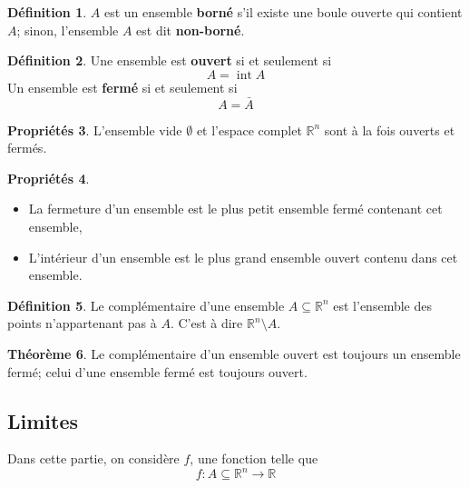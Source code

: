 \documentclass[11pt,a4paper]{article}
\theoremstyle{definition}
\newtheorem{mydef}{Définition}%
\newtheorem{myprop}[mydef]{Propriétés}
\newtheorem{mytheo}[mydef]{Théorème}
\DeclareMathOperator{\newint}{int}
\newcommand{\R}{\mathbb{R}}
\newcommand{\Rn}{\R^n}
\newcommand*\InsertTheoremBreak{%
	\begingroup %
		\setlength\itemsep{0pt}%
		\setlength\parsep{0pt}%
		\item[\vbox{\null}]%
	\endgroup%
}%
\begin{document}
\begin{mydef}
	$A$ est un ensemble \textbf{borné} s'il existe une boule ouverte qui contient $A$;
	sinon, l'ensemble $A$ est dit \textbf{non-borné}.
\end{mydef}

\begin{mydef}
	Une ensemble est \textbf{ouvert} si et seulement si
	\[ A = \newint A \]
	Un ensemble est \textbf{fermé} si et seulement si
	\[ A = \bar{A} \]
\end{mydef}

\begin{myprop}
	L'ensemble vide $\emptyset$ et l'espace complet $\Rn$ sont à la fois ouverts et fermés.
\end{myprop}

\begin{myprop}\InsertTheoremBreak
	\begin{itemize}
		\item La fermeture d'un ensemble est le plus petit ensemble fermé contenant cet ensemble,
		\item L'intérieur d'un ensemble est le plus grand ensemble ouvert contenu dans cet ensemble.
	\end{itemize}
\end{myprop}

\begin{mydef}
	Le complémentaire d'une ensemble $A \subseteq \Rn$ est l'ensemble des points n'appartenant pas à $A$.
	C'est à dire $\Rn \setminus A$.
\end{mydef}

\begin{mytheo}
	Le complémentaire d'un ensemble ouvert est toujours un ensemble fermé;
	celui d'une ensemble fermé est toujours ouvert.
\end{mytheo}

\subsection{Limites}

Dans cette partie, on considère $f$, une fonction telle que
\[ f : A \subseteq \R^n \to \R \]
\end{document}
